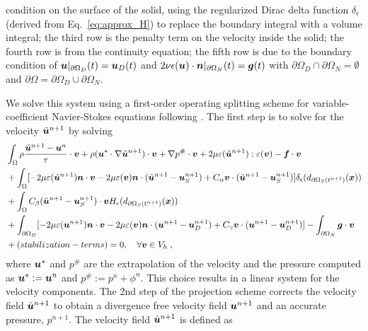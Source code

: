 condition on the surface of the solid, using the regularized Dirac delta function $\delta_{\epsilon}$ (derived from Eq.~\ref{eq:approx_H}) to replace the boundary integral with a volume integral; the third row is the penalty term on the velocity inside 
the solid; the fourth row is from the continuity equation; the fifth row is due to the boundary condition of $\boldsymbol{u}|_{\partial\Omega_D}(t)=\boldsymbol{u}_D(t)$ and $2\nu\epsilon(\boldsymbol{u})\cdot\boldsymbol{n}|_{\partial\Omega_N}(t)=\boldsymbol{g}(t)$ with $\partial\Omega_D\cap\partial\Omega_N=\emptyset$ and  $\partial\Omega=\partial\Omega_D\cup\partial\Omega_N$.

We solve this system using a first-order operating splitting scheme for variable-coefficient Navier-Stokes equations following \cite{GS09}. The first step is to solve for the velocity $\tilde{\boldsymbol{u}}^{n+1}$ by solving
\begin{align}
&\int_\Omega\rho\frac{\tilde{\boldsymbol{u}}^{n+1}-\boldsymbol{u}^n}{\tau}\cdot\boldsymbol{v} + \rho(\boldsymbol{u}^*\cdot\nabla\tilde{\boldsymbol{u}}^{n+1}) \cdot \boldsymbol{v} 
+\nabla p^{\#}\cdot\boldsymbol{v} +2\mu \varepsilon(\tilde{\boldsymbol{u}}^{n+1}):\varepsilon(\boldsymbol{v})
-\boldsymbol{f}\cdot\boldsymbol{v}\nonumber\\
&+\int_\Omega [-2\mu \varepsilon(\tilde{\boldsymbol{u}}^{n+1})\boldsymbol{n}\cdot\boldsymbol{v}
-2\mu\varepsilon(\boldsymbol{v})\boldsymbol{n}\cdot(\tilde{\boldsymbol{u}}^{n+1}-\boldsymbol{u}_S^{n+1})
+C_\alpha\boldsymbol{v}\cdot(\tilde{\boldsymbol{u}}^{n+1}-\boldsymbol{u}_S^{n+1})]\delta_\epsilon(d_{\partial\Omega_S(t^{n+1})}(\boldsymbol{x}))\nonumber\\
&+\int_\Omega C_\beta (\tilde{\boldsymbol{u}}^{n+1}-\boldsymbol{u}_S^{n+1})\cdot\boldsymbol{v} H_\epsilon(d_{\partial\Omega_S(t^{n+1})}(\boldsymbol{x}))\nonumber\\
&+\int_{\partial\Omega_D} [-2\mu\varepsilon(\boldsymbol{u}^{n+1})\boldsymbol{n}\cdot\boldsymbol{v}
-2\mu\varepsilon(\boldsymbol{v})\boldsymbol{n}\cdot(\boldsymbol{u}^{n+1}-\boldsymbol{u}_D^{n+1})
+C_\gamma\boldsymbol{v}\cdot(\boldsymbol{u}^{n+1}-\boldsymbol{u}_D^{n+1})]-\int_{\partial\Omega_N}\boldsymbol{g}\cdot\boldsymbol{v}\nonumber\\
&+(stabilization-terms)=0,\quad\forall \boldsymbol{v}\in V_h \; ,
\end{align}
where $\boldsymbol{u}^*$ and $p^\#$ are the extrapolation of the velocity and the pressure computed as $\boldsymbol{u}^*:=\boldsymbol{u}^n$ and $p^\#:=p^n+\phi^{n}$. This choice results in a linear system for the velocity components.
The 2nd step of the projection scheme corrects the velocity field $\tilde{\boldsymbol{u}}^{n+1}$ to obtain 
a divergence free velocity field ${\boldsymbol{u}}^{n+1}$ and an accurate pressure, $p^{n+1}$. The velocity field $\tilde{\boldsymbol{u}}^{n+1}$ is defined as 

